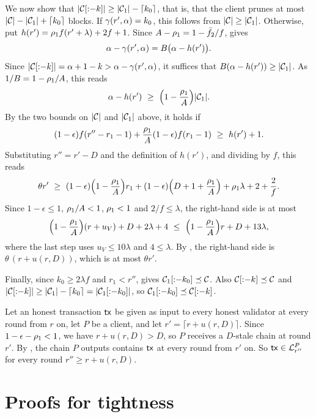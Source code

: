 \begin{proofof}{}
    We now show that $\lvert \mathcal{C}[{:}{-}k]\rvert\ge\lvert \mathcal{C}_1\rvert-\lceil k_0\rceil$, that
    is, that the client prunes at most $\lvert \mathcal{C}\rvert-\lvert \mathcal{C}_1\rvert+\lceil k_0\rceil$
    blocks. If $\gamma(r',\alpha)=k_0$, this follows from $\lvert \mathcal{C}\rvert\ge\lvert \mathcal{C}_1\rvert$.
    Otherwise, put $h(r')=\rho_1 f(r'+\lambda)+2f+1$. Since
    $A-\rho_1=1-\bar{f}_2/f$,  gives
    \[
        \alpha-\gamma(r',\alpha)=B\big(\alpha-h(r')\big) .
    \]
    Since $\lvert \mathcal{C}[{:}{-}k]\rvert=\alpha+1-k>\alpha-\gamma(r',\alpha)$, it suffices
    that $B(\alpha-h(r'))\ge\lvert \mathcal{C}_1\rvert$. As $1/B=1-\rho_1/A$,
    this reads
    \[
        \hgt-h(r')\ \ge\ \Big(1-\frac{\advrone}{\maxr}\Big)\len{\ch_1} .
    \]
    By the two bounds on $\lvert \mathcal{C}\rvert$ and $\lvert \mathcal{C}_1\rvert$ above, it holds if
    \[
        (1-\epsilon)f(r''-r_1-1)+\frac{\advrone}{\maxr}(1-\epsilon)f(r_1-1)\ \ge\ h(r')+1 .
    \]
    Substituting $r''=r'-D$ and the definition of $h(r')$, and dividing by $f$,
    this reads
    \[
        \theta r'\ \ge\ (1-\epsilon)\Big(1-\frac{\advrone}{\maxr}\Big)r_1
        +(1-\epsilon)\Big(D+1+\frac{\advrone}{\maxr}\Big)+\advrone\lambda+2+\frac{2}{f} .
    \]
    Since $1-\epsilon\le1$, $\rho_1/A<1$, $\rho_1<1$ and $2/f\le\lambda$,
    the right-hand side is at most
    \[
        \Big(1-\frac{\rho_1}{A}\Big)(r+u_V)+D+2\lambda+4
        \ \le\ \Big(1-\frac{\rho_1}{A}\Big)r+D+13\lambda ,
    \]
    where the last step uses $u_V\le10\lambda$ and $4\le\lambda$. By
    , the right-hand side is $\theta\,(r+u(r,D))$, which is at most
    $\theta r'$.

    Finally, since $k_0\ge2\lambda f$ and $r_1<r''$, 
    gives $\mathcal{C}_1[{:}{-}k_0]\preceq\mathcal{C}$. Also $\mathcal{C}[{:}{-}k]\preceq\mathcal{C}$ and
    $\lvert \mathcal{C}[{:}{-}k]\rvert\ge\lvert \mathcal{C}_1\rvert-\lceil k_0\rceil=\lvert \mathcal{C}_1[{:}{-}k_0]\rvert$,
    so $\mathcal{C}_1[{:}{-}k_0]\preceq\mathcal{C}[{:}{-}k]$.
\end{proofof}

\begin{proofof}{}
    Let an honest transaction $\mathsf{tx}$ be given as input to every honest validator
    at every round from $r$ on, let $P$ be a client, and let
    $r'=\lceil r+u(r,D)\rceil$. Since $1-\epsilon-\rho_1<1$, we have
    $r+u(r,D)>D$, so $P$ receives a $D$-stale chain at round $r'$. By
    , the chain $P$ outputs contains $\mathsf{tx}$ at every round
    from $r'$ on. So $\mathsf{tx}\in\mathcal{L}^P_{r''}$ for every round
    $r''\ge r+u(r,D)$.
\end{proofof}

\section{Proofs for tightness}
\label{appendix.tightness}

